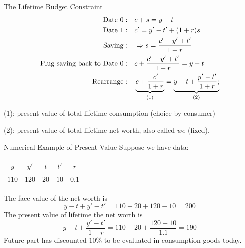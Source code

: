 \documentclass[11pt,aspectratio=169,usenames,dvipsnames]{beamer}
\let\tempone\itemize
\let\temptwo\enditemize
\renewenvironment{itemize}{\tempone\addtolength{\itemsep}{\fill}}{\temptwo}
\begin{document}
\begin{frame}{The Lifetime Budget Constraint}
\label{slide:The_Lifetime_Budget_Constraint}
    \begin{align*}
        \text{Date 0}: \quad
            & c + s = y - t
        \\
        \text{Date 1}: \quad
            & c' = y' - t' + ( 1+r )s
        \\
        \text{Saving}: \quad
            & \Rightarrow s = \frac{c' - y' + t'}{1+r}
        \\
        \text{Plug saving back to Date 0}: \quad
            & c + \frac{c' - y' + t'}{1+r} = y - t
        \\
        \text{Rearrange}: \quad
            & \underbrace{%
                c + \frac{c'}{1+r}
              }_{\text{(1)}}
                =
              \underbrace{%
                y - t + \frac{y' - t'}{1+r};
              }_{\text{(2)}}
    \end{align*}
    \begin{itemize}
        \item (1): \alert{present value of total lifetime consumption} (choice by consumer)
        \item (2): \alert{present value of total lifetime net worth}, also called $ we $ (fixed).
    \end{itemize}
\end{frame}

\begin{frame}{Numerical Example of Present Value}
\label{slide:Numerical_Example_of_Present_Value}
    Suppose we have data:
    \begin{tabular}{| c | c | c | c | c | }
        \hline
        $ y $
            & $ y' $
            & $ t $
            & $ t' $
            & $ r $
        \\
        \hline
        \hline
        $ 110 $
            & $120$
            & $ 20 $
            & $ 10 $
            & 0.1
        \\
        \hline
    \end{tabular}

    The face value of the net worth is
    \begin{equation*}
        y - t + y' - t' = 110 - 20 + 120 - 10 = 200
    \end{equation*}
    The present value of lifetime the net worth is
    \begin{equation*}
        y - t + \frac{y' - t'}{1+r} = 110 - 20 + \frac{120 - 10}{1.1} = 190
    \end{equation*}
    Future part has discounted $ 10\% $ to be evaluated in consumption goods today.
\end{frame}
\end{document}
